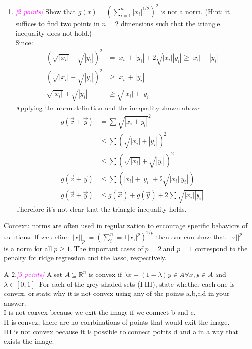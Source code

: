 \documentclass{article}
\newcommand{\field}[1]{\mathbb{#1}}
\newcommand{\1}{\mathbf{1}}
\newcommand{\R}{\field{R}} %
\newcommand{\points}[1]{\small\textcolor{magenta}{\emph{[#1 points]}} \normalsize}
\begin{document}
\begin{enumerate}
\newpage
\item \points{2} Show that $g(x) =(\sum^n_{i=1}|x_i|^{1/2})^2$ is not a norm. (Hint: it suffices to find two points in $n= 2$ dimensions such that the triangle inequality does not hold.) \\
Since:
\begin{align*}
    (\sqrt{|x_i|} + \sqrt{|y_i|})^2 &= |x_i| + |y_i| + 2\sqrt{|x_i||y_i|} \geq |x_i| + |y_i| \\
    (\sqrt{|x_i|} + \sqrt{|y_i|})^2 &\geq |x_i| + |y_i| \\
    \sqrt{|x_i|} + \sqrt{|y_i|} &\geq \sqrt{|x_i| + |y_i|}
\end{align*}
Applying the norm definition and the inequality shown above:
\begin{align*}
    g(\vec x + \vec y) &= \sum \sqrt{|x_i + y_i|}^2 \\
    &\leq \sum (\sqrt{|x_i|+|y_i|})^2 \\
    &\leq \sum (\sqrt{|x_i|}+\sqrt{|y_i|})^2 \\
    g(\vec x + \vec y) &\leq \sum \left(|x_i| + |y_i| + 2\sqrt{|x_i||y_i|}\right) \\
    g(\vec x + \vec y) &\leq g(\vec x) + g(\vec y) + 2\sum\sqrt{|x_i||y_i|}
\end{align*}
Therefore it's not clear that the triangle inequality holds. 

\end{enumerate}

Context: norms are often used in regularization to encourage specific behaviors of solutions. If we define $||x||_p:= (\sum^n_i = \1|x_i|^p)^{1/p}$ then one can show that $||x||^p$ is a norm for all $p\ge1$. The important cases of $p=2$ and $p=1$ correspond to the penalty for ridge regression and the lasso, respectively.


\vskip 2cm
A 2.\points{3} A set $A\subseteq \R^n$ is convex if $\lambda x + (1-\lambda)y \in A \forall x,y \in A$ and $\lambda\in [0,1]$. For each of the grey-shaded sets (I-III), state whether each one is convex, or state why it is not convex using any of the points a,b,c,d in your answer.\\
I is not convex because we exit the image if we connect b and c. \\
II is convex, there are no combinations of points that would exit the image. \\
III is not convex because it is possible to connect points d and a in a way that exists the image.
\end{document}
